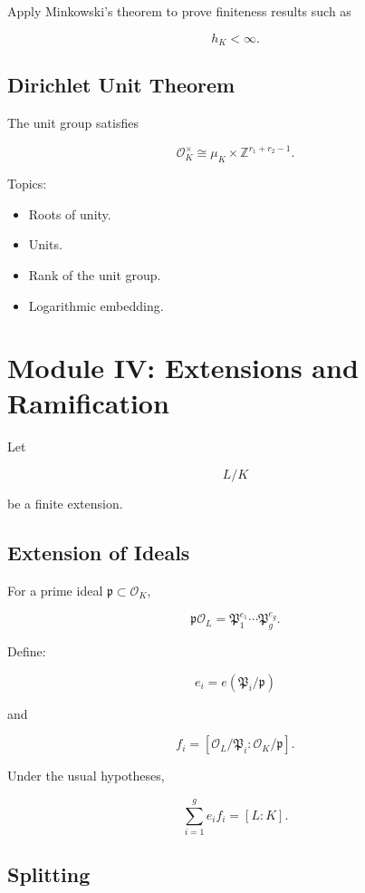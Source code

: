 \documentclass[11pt]{article}
\begin{document}
Apply Minkowski's theorem to prove finiteness results such as

\[
\boxed{h_K<\infty.}
\]

\subsection{Dirichlet Unit Theorem}

The unit group satisfies

\[
\boxed{
\mathcal{O}_K^\times
\cong
\mu_K\times\mathbb{Z}^{r_1+r_2-1}.
}
\]

Topics:

\begin{itemize}
    \item Roots of unity.
    \item Units.
    \item Rank of the unit group.
    \item Logarithmic embedding.
\end{itemize}

\section{Module IV: Extensions and Ramification}

Let

\[
L/K
\]

be a finite extension.

\subsection{Extension of Ideals}

For a prime ideal $\mathfrak{p}\subset\mathcal{O}_K$,

\[
\mathfrak{p}\mathcal{O}_L
=
\mathfrak{P}_1^{e_1}
\cdots
\mathfrak{P}_g^{e_g}.
\]

Define:

\[
e_i=e(\mathfrak{P}_i/\mathfrak{p})
\]

and

\[
f_i
=
[\mathcal{O}_L/\mathfrak{P}_i:
\mathcal{O}_K/\mathfrak{p}].
\]

Under the usual hypotheses,

\[
\boxed{
\sum_{i=1}^g e_i f_i=[L:K].
}
\]

\subsection{Splitting}
\end{document}

